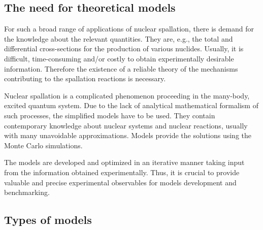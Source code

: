 

\subsection{The need for theoretical models}

For such a broad range of applications of nuclear spallation, there is demand for the 
knowledge about the relevant quantities.
They are, e.g., the total and differential cross-sections for the production of various nuclides. Usually, it is difficult, time-consuming and/or costly to obtain experimentally desirable information. 
Therefore the existence of a reliable theory of the mechanisms contributing to the spallation reactions is necessary.

Nuclear spallation is a complicated phenomenon proceeding in the many-body, excited quantum system. Due to the lack of analytical mathematical formalism of such processes, the simplified models 
have to be used.
They contain contemporary knowledge about nuclear systems and nuclear reactions, 
usually with many unavoidable approximations. Models provide the solutions using the Monte Carlo simulations.

The models are developed and optimized in an iterative manner taking input from the information obtained experimentally.
Thus, it is crucial to provide valuable and precise experimental observables for models development and benchmarking.


\subsection{Types of models}

